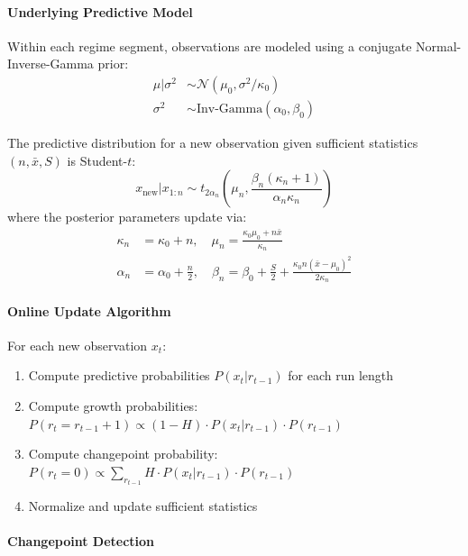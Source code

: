 \paragraph{Underlying Predictive Model}

Within each regime segment, observations are modeled using a conjugate Normal-Inverse-Gamma prior:
\begin{align}
  \mu | \sigma^2 &\sim \mathcal{N}(\mu_0, \sigma^2 / \kappa_0) \\
  \sigma^2 &\sim \text{Inv-Gamma}(\alpha_0, \beta_0)
\end{align}

The predictive distribution for a new observation given sufficient statistics $(n, \bar{x}, S)$ is Student-$t$:
\begin{equation}
  x_{\text{new}} | x_{1:n} \sim t_{2\alpha_n}\left( \mu_n, \frac{\beta_n(\kappa_n + 1)}{\alpha_n \kappa_n} \right)
\end{equation}
where the posterior parameters update via:
\begin{align}
  \kappa_n &= \kappa_0 + n, \quad \mu_n = \frac{\kappa_0 \mu_0 + n\bar{x}}{\kappa_n} \\
  \alpha_n &= \alpha_0 + \frac{n}{2}, \quad \beta_n = \beta_0 + \frac{S}{2} + \frac{\kappa_0 n (\bar{x} - \mu_0)^2}{2\kappa_n}
\end{align}

\paragraph{Online Update Algorithm}

For each new observation $x_t$:
\begin{enumerate}
  \item Compute predictive probabilities $P(x_t | r_{t-1})$ for each run length
  \item Compute growth probabilities: $P(r_t = r_{t-1} + 1) \propto (1 - H) \cdot P(x_t | r_{t-1}) \cdot P(r_{t-1})$
  \item Compute changepoint probability: $P(r_t = 0) \propto \sum_{r_{t-1}} H \cdot P(x_t | r_{t-1}) \cdot P(r_{t-1})$
  \item Normalize and update sufficient statistics
\end{enumerate}

\paragraph{Changepoint Detection}


